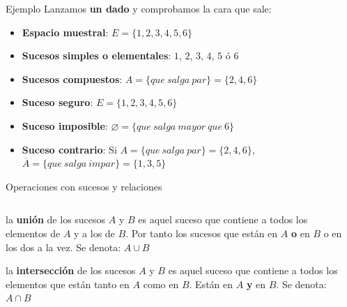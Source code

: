 \documentclass[11pt]{beamer}
\begin{document}
\begin{frame}{Ejemplo}
Lanzamos \textbf{un dado} y comprobamos la cara que sale:
\begin{itemize}[<+->]
\item \textbf{Espacio muestral}: $E=\lbrace 1,2,3,4,5,6 \rbrace $
\item \textbf{Sucesos simples o elementales}: $1$, $2$, $3$, $4$, $5$ ó $6$
\item \textbf{Sucesos compuestos}: $A=\lbrace que\ salga\ par\rbrace=\lbrace2,4,6\rbrace$
\item \textbf{Suceso seguro}: $E=\lbrace 1,2,3,4,5,6 \rbrace $
\item \textbf{Suceso imposible}: $\varnothing=\lbrace que\ salga \ mayor \ que \ 6\rbrace$
\item \textbf{Suceso contrario}: Si $A=\lbrace que\ salga\ par\rbrace=\lbrace2,4,6\rbrace$, $\overline{A}=\lbrace que\ salga\ impar\rbrace=\lbrace1,3,5\rbrace$ 
\end{itemize}
\end{frame}


\begin{frame}
{Operaciones con sucesos y relaciones}
\begin{columns}
\begin{column}{0.6\textwidth}
\begin{block}{}
la \textbf{unión} de los sucesos $A$ y $B$ es aquel suceso que contiene a todos los elementos de $A$ y a  los de $B$. Por tanto los sucesos que están en $A$ \textbf{o} en $B$ o en los dos a la vez. Se denota: $A\cup B$ 
\end{block}
\begin{block}{}
la \textbf{intersección} de los sucesos $A$ y $B$ es aquel suceso que contiene a todos los elementos que están tanto en $A$ como en $B$. Están en $A$ \textbf{y} en $B$. Se denota: $A\cap B$ 
\end{block}


\end{column}
\begin{column}{0.4\textwidth}



\end{column}
\end{columns}

\end{frame}
\end{document}

